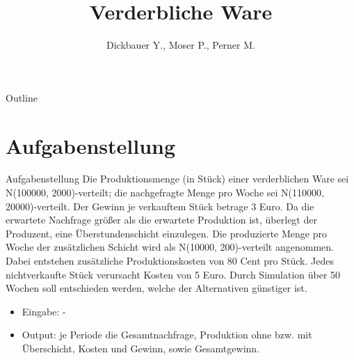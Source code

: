 

\title[BSP19 - Verderbliche Ware]{Verderbliche Ware}
\author{Dickbauer Y., Moser P., Perner M.}



\begin{frame}
  \titlepage
\end{frame}

\begin{frame}{Outline}
  \tableofcontents
\end{frame}

\section{Aufgabenstellung}
\begin{frame}{Aufgabenstellung}
Die Produktionsmenge (in Stück) einer verderblichen Ware sei N(100000, 2000)-verteilt;
die nachgefragte Menge pro Woche sei N(110000, 20000)-verteilt. Der Gewinn je verkauftem
Stück betrage 3 Euro.
Da die erwartete Nachfrage größer als die erwartete Produktion ist, überlegt der Produzent,
eine Überstundenschicht einzulegen. Die produzierte Menge pro Woche der zusätzlichen
Schicht wird als N(10000, 200)-verteilt angenommen. Dabei entstehen zusätzliche
Produktionskosten von 80 Cent pro Stück. Jedes nichtverkaufte Stück verursacht Kosten
von 5 Euro. Durch Simulation über 50 Wochen soll entschieden werden, welche der
Alternativen günstiger ist.

\begin{itemize}
  \item Eingabe: -
  \item Output: je Periode die Gesamtnachfrage, Produktion ohne bzw. mit Überschicht,
Kosten und Gewinn, sowie Gesamtgewinn.
\end{itemize}
\end{frame}


